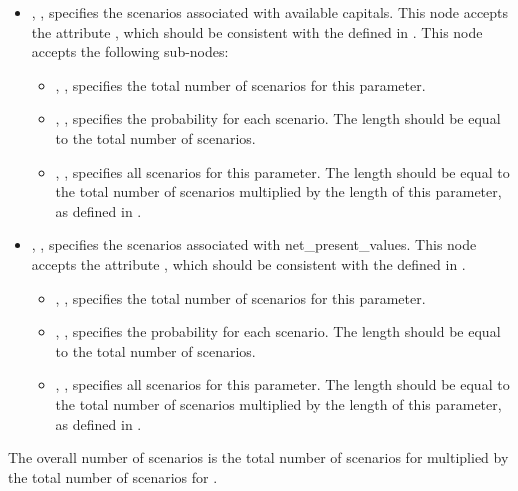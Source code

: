 \begin{itemize}
  \item {}, , specifies the scenarios
  associated with available capitals. This node accepts the attribute , which
  should be consistent with the  defined in .
  This node accepts the following sub-nodes:
  \begin{itemize}
    \item {}, , specifies the total
    number of scenarios for this parameter.
    \item {}, ,
    specifies the probability for each scenario. The length should be equal to the total number of
    scenarios.
    \item {}, ,
    specifies all scenarios for this parameter. The length should be equal to the total number
    of scenarios multiplied by the length of this parameter, as defined in .
  \end{itemize}

  \item {}, , specifies the scenarios
  associated with net\_present\_values. This node accepts the attribute , which
  should be consistent with the  defined in .
  \begin{itemize}
    \item {}, , specifies the total
    number of scenarios for this parameter.
    \item {}, ,
    specifies the probability for each scenario. The length should be equal to the total number of
    scenarios.
    \item {}, ,
    specifies all scenarios for this parameter. The length should be equal to the total number
    of scenarios multiplied by the length of this parameter, as defined in .
  \end{itemize}
\end{itemize}

The overall number of scenarios is the total number of scenarios for 
multiplied by the total number of scenarios for .

